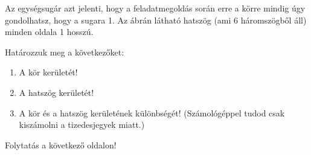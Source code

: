 \documentclass[a4paper,12pt]{article}
\begin{document}
Az egységsugár azt jelenti, hogy a feladatmegoldás során erre a körre
mindig úgy gondolhatsz, hogy a sugara 1.  Az ábrán látható hatszög
(ami 6 háromszögből áll) minden oldala 1 hosszú.

Határozzuk meg a következőket:

\begin{enumerate}[label=\alph*)]
\item A kör kerületét!
\item A hatszög kerületét!
\item A kör és a hatszög kerületének különbségét! \newline (Számológéppel tudod csak kiszámolni a tizedesjegyek miatt.)
\end{enumerate}

Folytatás a következő oldalon!

\newpage

\def\rajz#1#2#3{
  \begin{center}
    \begin{tikzpicture}[yscale=-1,rotate=-0.5*#2]
      \pgfmathsetmacro{\scale}{#1}
      \pgfmathsetmacro{\angle}{#2}
      \pgfmathsetmacro{\length}{#3}
      \draw (0,0) coordinate (a) node[left]{$A$}
      -- ([turn]90:\scale) coordinate (b) node[right]{$B$}
      -- ([turn]90+0.5*\angle:\scale*\length) coordinate (c) node[below]{$C$}
      -- ([turn]90+0.5*\angle:\scale);
      \path[name path=bc] (b) -- (c);
      \path[name path=felezo] (a) -- (0.5*\angle:\scale);


      \scoped[on background layer] \fill [red!20] (a) -- (b) -- (c);

      \draw (\scale,0) [name path=kor] arc [start angle=0, end angle=\angle, radius=\scale];
      \scoped[on background layer]\fill [blue!20, intersection segments={of=bc and kor}];

      \begin{scope}[green!50!black, very thick]
        \path[name intersections={of=bc and felezo,  by=x}] (x) node[below left] {$X$};
        \path[name intersections={of=felezo and kor, by=y}] (y) node[right     ] {$Y$};

        \draw (a) -- (y);
        \draw (b) -- (y) -- (c);

        \pic [pic text=., angle radius = 3mm, draw] {angle = b--x--a};
        \pic [pic text=., angle radius = 3mm, draw] {angle = y--x--b};
      \end{scope}
    \end{tikzpicture}
  \end{center}
}
\end{document}
